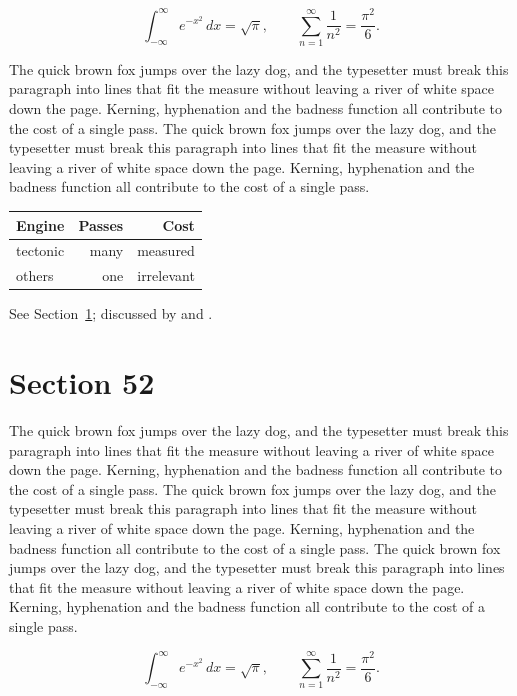 \documentclass{article}
\begin{document}
\begin{equation}\label{eq:51}
\int_{-\infty}^{\infty} e^{-x^{2}}\,dx = \sqrt{\pi}, \qquad
\sum_{n=1}^{\infty} \frac{1}{n^{2}} = \frac{\pi^{2}}{6}.
\end{equation}

The quick brown fox jumps over the lazy dog, and the typesetter must break this paragraph into lines that fit the measure without leaving a river of white space down the page. Kerning, hyphenation and the badness function all contribute to the cost of a single pass. The quick brown fox jumps over the lazy dog, and the typesetter must break this paragraph into lines that fit the measure without leaving a river of white space down the page. Kerning, hyphenation and the badness function all contribute to the cost of a single pass. 

\begin{center}
\begin{tabular}{lrr}
\toprule
Engine & Passes & Cost \\
\midrule
tectonic & many & measured \\
others & one & irrelevant \\
\bottomrule
\end{tabular}
\end{center}

See Section~\ref{sec:52}; discussed by \textcite{k2} and \textcite{l4}.
\section{Section 52}
\label{sec:52}
The quick brown fox jumps over the lazy dog, and the typesetter must break this paragraph into lines that fit the measure without leaving a river of white space down the page. Kerning, hyphenation and the badness function all contribute to the cost of a single pass. The quick brown fox jumps over the lazy dog, and the typesetter must break this paragraph into lines that fit the measure without leaving a river of white space down the page. Kerning, hyphenation and the badness function all contribute to the cost of a single pass. The quick brown fox jumps over the lazy dog, and the typesetter must break this paragraph into lines that fit the measure without leaving a river of white space down the page. Kerning, hyphenation and the badness function all contribute to the cost of a single pass. 

\begin{equation}\label{eq:52}
\int_{-\infty}^{\infty} e^{-x^{2}}\,dx = \sqrt{\pi}, \qquad
\sum_{n=1}^{\infty} \frac{1}{n^{2}} = \frac{\pi^{2}}{6}.
\end{equation}
\end{document}
